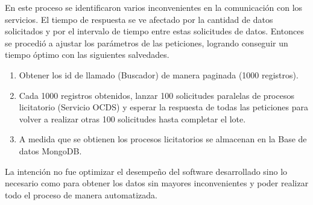 En este proceso se identificaron varios inconvenientes en la comunicación con los servicios. El tiempo de respuesta se ve afectado por la cantidad de datos solicitados y por el intervalo de tiempo entre estas solicitudes de datos. Entonces se procedió a ajustar los parámetros de las peticiones, logrando conseguir un tiempo óptimo con las siguientes salvedades.

\begin{enumerate}

    \item Obtener los id de llamado (Buscador) de manera paginada (1000 registros).
    \item Cada 1000 registros obtenidos, lanzar 100 solicitudes paralelas de procesos licitatorio (Servicio OCDS) y esperar la respuesta de todas las peticiones para volver a realizar otras 100 solicitudes hasta completar el lote.
    \item A medida que se obtienen los procesos licitatorios se almacenan en la Base de datos MongoDB.
  
\end{enumerate}

La intención no fue optimizar el desempeño del software desarrollado sino lo necesario como para obtener los datos sin mayores inconvenientes y poder realizar todo el proceso de manera automatizada.


